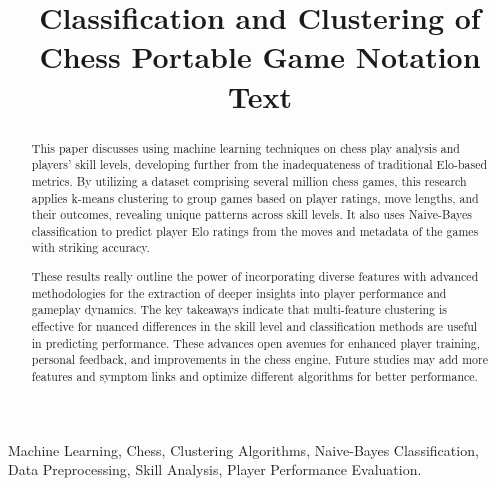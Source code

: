 \documentclass[conference]{IEEEtran}
\begin{document}
\title{Classification and Clustering of Chess Portable Game Notation Text\\
}

\author{
\and
{}
}

\maketitle

\begin{abstract}
This paper discusses using machine learning techniques on chess play analysis and players' skill levels, developing further from the inadequateness of traditional Elo-based metrics. By utilizing a dataset comprising several million chess games, this research applies k-means clustering to group games based on player ratings, move lengths, and their outcomes, revealing unique patterns across skill levels. It also uses Naive-Bayes classification to predict player Elo ratings from the moves and metadata of the games with striking accuracy.

These results really outline the power of incorporating diverse features with advanced methodologies for the extraction of deeper insights into player performance and gameplay dynamics. The key takeaways indicate that multi-feature clustering is effective for nuanced differences in the skill level and classification methods are useful in predicting performance. These advances open avenues for enhanced player training, personal feedback, and improvements in the chess engine. Future studies may add more features and symptom links and optimize different algorithms for better performance.
\end{abstract}

\begin{IEEEkeywords}
Machine Learning, Chess, Clustering Algorithms, Naive-Bayes Classification, Data Preprocessing, Skill Analysis, Player Performance Evaluation.
\end{IEEEkeywords}
\end{document}
